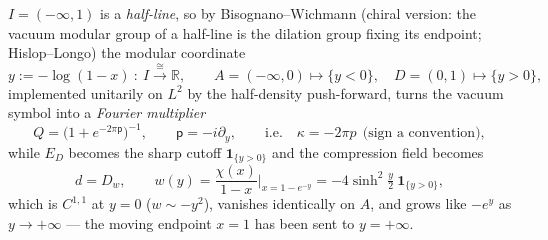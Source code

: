 \documentclass[11pt]{article}
\begin{document}
$I=(-\infty,1)$ is a \emph{half-line}, so by Bisognano--Wichmann (chiral version: the
vacuum modular group of a half-line is the dilation group fixing its endpoint; Hislop--Longo)
the modular coordinate
\begin{equation}\label{eq:ycoord}
 y:=-\log(1-x)\ :\ I\xrightarrow{\ \cong\ }\mathbb R,\qquad
 A=(-\infty,0)\mapsto\{y<0\},\quad D=(0,1)\mapsto\{y>0\},
\end{equation}
implemented unitarily on $L^2$ by the half-density push-forward, turns the vacuum symbol
into a \emph{Fourier multiplier}
\begin{equation}\label{eq:Qmult}
 Q=\bigl(1+e^{-2\pi\mathsf p}\bigr)^{-1},\qquad \mathsf p=-i\partial_y,\qquad
 \text{i.e.}\quad \kappa=-2\pi p\ \ \text{(sign a convention)},
\end{equation}
while $E_D$ becomes the sharp cutoff $\mathbf 1_{\{y>0\}}$ and the compression field becomes
\begin{equation}\label{eq:wfield}
 d=D_w,\qquad w(y)=\frac{\chi(x)}{1-x}\Big|_{x=1-e^{-y}}=-4\sinh^2\!\tfrac y2\ \mathbf 1_{\{y>0\}} ,
\end{equation}
which is $C^{1,1}$ at $y=0$ ($w\sim-y^2$), vanishes identically on $A$, and grows like
$-e^{y}$ as $y\to+\infty$ --- the moving endpoint $x=1$ has been sent to $y=+\infty$.
\end{document}
